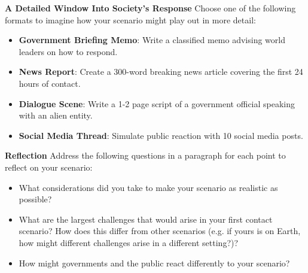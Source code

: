\documentclass[12pt]{article}
\begin{document}
\vspace{0.5cm}
{\bf{\noindent A Detailed Window Into Society's Response}}
\vspace{5pt}
\noindent Choose one of the following formats to imagine how your scenario might
play out in more detail:
    \begin{itemize}
        \item \textbf{Government Briefing Memo}: Write a classified memo
        advising world leaders on how to respond.
        \item \textbf{News Report}: Create a 300-word breaking news article
        covering the first 24 hours of contact.
        \item \textbf{Dialogue Scene}: Write a 1-2 page script of a government
        official speaking with an alien entity.
        \item \textbf{Social Media Thread}: Simulate public reaction with 10
        social media posts.
    \end{itemize}

\vspace{0.5cm}

{\bf{\noindent Reflection}}
\vspace{5pt}
\noindent Address the following questions in a paragraph for each point to
reflect on your scenario:
    \begin{itemize}
        \item What considerations did you take to make your scenario as
        realistic as possible?
        \item What are the largest challenges that would arise in your first
        contact scenario? How does this differ from other scenarios (e.g. if
        yours is on Earth, how might different challenges arise in a different
        setting?)?
        \item How might governments and the public react differently to your scenario?
    \end{itemize}
\end{document}
